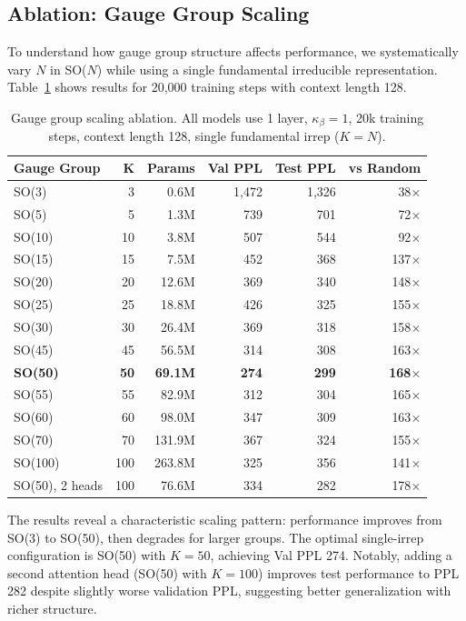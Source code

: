 \documentclass[twoside,11pt]{article}
\begin{document}
\subsection{Ablation: Gauge Group Scaling}

To understand how gauge group structure affects performance, we systematically vary $N$ in SO($N$) while using a single fundamental irreducible representation. Table~\ref{tab:ablation_capacity} shows results for 20,000 training steps with context length 128.

\begin{table}[h]
\centering
\small
\caption{Gauge group scaling ablation. All models use 1 layer, $\kappa_\beta=1$, 20k training steps, context length 128, single fundamental irrep ($K=N$).}
\label{tab:ablation_capacity}
\begin{tabular}{lrrrrr}
\toprule
\textbf{Gauge Group} & \textbf{K} & \textbf{Params} & \textbf{Val PPL} & \textbf{Test PPL} & \textbf{vs Random} \\
\midrule
SO(3) & 3 & 0.6M & 1,472 & 1,326 & 38$\times$ \\
SO(5) & 5 & 1.3M & 739 & 701 & 72$\times$ \\
SO(10) & 10 & 3.8M & 507 & 544 & 92$\times$ \\
SO(15) & 15 & 7.5M & 452 & 368 & 137$\times$ \\
SO(20) & 20 & 12.6M & 369 & 340 & 148$\times$ \\
SO(25) & 25 & 18.8M & 426 & 325 & 155$\times$ \\
SO(30) & 30 & 26.4M & 369 & 318 & 158$\times$ \\
SO(45) & 45 & 56.5M & 314 & 308 & 163$\times$ \\
\textbf{SO(50)} & \textbf{50} & \textbf{69.1M} & \textbf{274} & \textbf{299} & \textbf{168$\times$} \\
SO(55) & 55 & 82.9M & 312 & 304 & 165$\times$ \\
SO(60) & 60 & 98.0M & 347 & 309 & 163$\times$ \\
SO(70) & 70 & 131.9M & 367 & 324 & 155$\times$ \\
SO(100) & 100 & 263.8M & 325 & 356 & 141$\times$ \\
\midrule
SO(50), 2 heads & 100 & 76.6M & 334 & 282 & 178$\times$ \\
\bottomrule
\end{tabular}
\end{table}

The results reveal a characteristic scaling pattern: performance improves from SO(3) to SO(50), then degrades for larger groups. The optimal single-irrep configuration is SO(50) with $K=50$, achieving Val PPL 274. Notably, adding a second attention head (SO(50) with $K=100$) improves test performance to PPL 282 despite slightly worse validation PPL, suggesting better generalization with richer structure.
\end{document}
